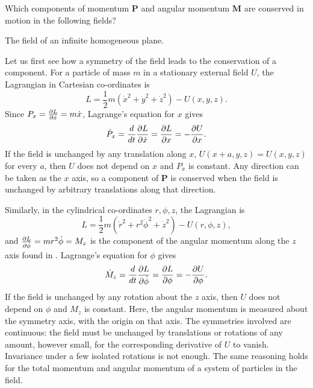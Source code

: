 
\begin{problem}
{
Which components of momentum $\mathbf{P}$ and angular momentum $\mathbf{M}$ are conserved in motion in the following fields?
}{}{}
\end{problem}
\begin{subproblem}
{
The field of an infinite homogeneous plane.
}
{
Let us first see how a symmetry of the field leads to the conservation of a component. For a particle of mass $m$ in a stationary external field $U$, the Lagrangian in Cartesian co-ordinates is
\begin{equation*}
    L = \frac{1}{2} m (\Dot{x}^2 + \Dot{y}^2 + \Dot{z}^2) - U(x,y,z).
\end{equation*}
Since $P_x = \frac{\partial L}{\partial \Dot{x}} = m\Dot{x}$, Lagrange's equation for $x$ gives
\begin{equation*}
    \Dot{P}_x = \frac{d}{dt} \frac{\partial L}{\partial \Dot{x}} = \frac{\partial L}{\partial x} = -\frac{\partial U}{\partial x} .
\end{equation*}
If the field is unchanged by any translation along $x$, \ie $U(x+a,y,z) = U(x,y,z)$ for every $a$, then $U$ does not depend on $x$ and $P_x$ is constant. Any direction can be taken as the $x$ axis, so a component of $\mathbf{P}$ is conserved when the field is unchanged by arbitrary translations along that direction.

Similarly, in the cylindrical co-ordinates $r,\phi,z$, the Lagrangian is
\begin{equation*}
    L = \frac{1}{2} m (\Dot{r}^2 + r^2\Dot{\phi}^2 + \Dot{z}^2) - U(r,\phi,z),
\end{equation*}
and $\frac{\partial L}{\partial \Dot{\phi}} = mr^2\Dot{\phi} = M_z$ is the component of the angular momentum along the $z$ axis found in . Lagrange's equation for $\phi$ gives
\begin{equation*}
    \Dot{M}_z = \frac{d}{dt} \frac{\partial L}{\partial \Dot{\phi}} = \frac{\partial L}{\partial \phi} = -\frac{\partial U}{\partial \phi} .
\end{equation*}
If the field is unchanged by any rotation about the $z$ axis, then $U$ does not depend on $\phi$ and $M_z$ is constant. Here, the angular momentum is measured about the symmetry axis, \ie with the origin on that axis. The symmetries involved are continuous: the field must be unchanged by translations or rotations of any amount, however small, for the corresponding derivative of $U$ to vanish. Invariance under a few isolated rotations is not enough. The same reasoning holds for the total momentum and angular momentum of a system of particles in the field.

}
\end{subproblem}
